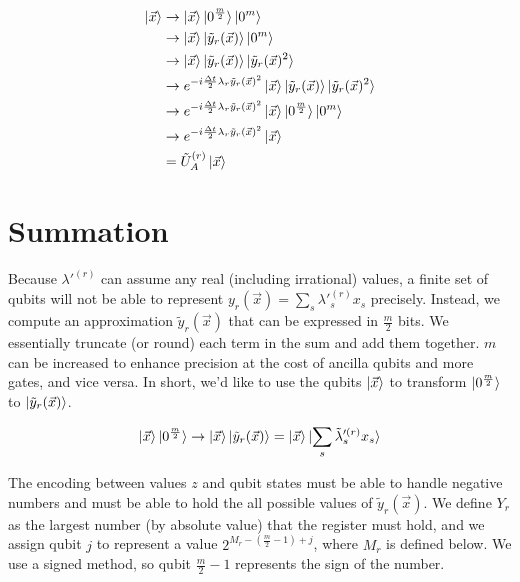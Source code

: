 \begin{align}
    \ket{\vec{x}} &\rightarrow \ket{\vec{x}}\ket{0^{\frac{m}{2}}}\ket{0^m} \\
    &\rightarrow \ket{\vec{x}}\ket{\tilde{y}_r(\vec{x})}\ket{0^m} \label{eq: summation}\\
    &\rightarrow \ket{\vec{x}}\ket{\tilde{y}_r(\vec{x})}\ket{\tilde{y}_r(\vec{x})^2} \label{eq: squaring} \\
    &\rightarrow e^{-i\frac{\Delta t}{2}\lambda_r\tilde{y}_r(\vec{x})^2}\ket{\vec{x}}\ket{\tilde{y}_r(\vec{x})}\ket{\tilde{y}_r(\vec{x})^2} \label{eq: phase} \\
    &\rightarrow e^{-i\frac{\Delta t}{2}\lambda_r\tilde{y}_r(\vec{x})^2}\ket{\vec{x}}\ket{0^{\frac{m}{2}}}\ket{0^m} \\
    &\rightarrow e^{-i\frac{\Delta t}{2}\lambda_r\tilde{y}_r(\vec{x})^2}\ket{\vec{x}} \\
    &= \tilde{U}_A^{(r)}\ket{\vec{x}}
\end{align}

\section{Summation}

Because $\lambda'^{(r)}$ can assume any real (including irrational) values, a finite set of qubits will not be able to represent $y_r(\vec{x}) = \sum_s \lambda'^{(r)}_s x_s$ precisely. Instead, we compute an approximation $\tilde{y}_r(\vec{x})$ that can be expressed in $\frac{m}{2}$ bits. We essentially truncate (or round) each term in the sum and add them together. $m$ can be increased to enhance precision at the cost of ancilla qubits and more gates, and vice versa. In short, we'd like to use the qubits $\ket{\vec{x}}$ to transform $\ket{0^{\frac{m}{2}}}$ to $\ket{\tilde{y}_r(\vec{x})}$.

\begin{equation}
    \ket{\vec{x}}\ket{0^{\frac{m}{2}}} \rightarrow \ket{\vec{x}}\ket{\tilde{y}_r(\vec{x})} = \ket{\vec{x}}\ket{\sum_s \tilde{\lambda}'^{(r)}_s x_s}
    \label{eq: summation2}
\end{equation}

The encoding between values $z$ and qubit states must be able to handle negative numbers and must be able to hold the all possible values of $\tilde{y}_r(\vec{x})$. We define $Y_r$ as the largest number (by absolute value) that the register must hold, and we assign qubit $j$ to represent a value $2^{M_r - (\frac{m}{2} - 1) + j}$, where $M_r$ is defined below. We use a signed method, so qubit $\frac{m}{2} - 1$ represents the sign of the number. 

